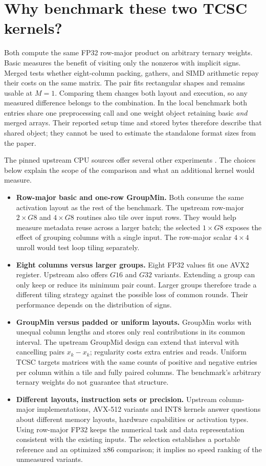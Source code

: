 \documentclass[11pt,a4paper]{article}
\begin{document}
\section{Why benchmark these two TCSC kernels?}
Both compute the same FP32 row-major product on arbitrary ternary weights.
Basic measures the benefit of visiting only the nonzeros with implicit signs.
Merged tests whether eight-column packing, gathers, and SIMD arithmetic repay
their costs on the same matrix. The pair fits rectangular shapes and remains
usable at \(M=1\). Comparing them changes both layout and execution, so any
measured difference belongs to the combination. In the local benchmark both
entries share one preprocessing call and one weight object retaining basic
\emph{and} merged arrays. Their reported setup time and stored bytes therefore
describe that shared object; they cannot be used to estimate the standalone
format sizes from the paper.

The pinned upstream CPU sources offer several other experiments \cite{tcscup}.
The choices below explain the scope of the comparison and what an additional
kernel would measure.
\begin{itemize}
\item \textbf{Row-major basic and one-row GroupMin.} Both consume the same
activation layout as the rest of the benchmark. The upstream row-major
\(2{\times}G8\) and \(4{\times}G8\) routines also tile over input rows.
They would help measure metadata reuse across a larger batch; the selected
\(1{\times}G8\) exposes the effect of grouping columns with a single input.
The row-major scalar \(4{\times}4\) unroll would test loop tiling separately.
\item \textbf{Eight columns versus larger groups.} Eight FP32 values fit
one AVX2 register. Upstream also offers \(G16\) and \(G32\) variants.
Extending a group can only keep or reduce its minimum pair count. Larger
groups therefore trade a different tiling strategy against the possible loss
of common rounds. Their performance depends on the distribution of signs.
\item \textbf{GroupMin versus padded or uniform layouts.} GroupMin works
with unequal column lengths and stores only real contributions in its common
interval. The upstream GroupMid design can extend that interval with cancelling
pairs \(x_k-x_k\); regularity costs extra entries and reads. Uniform TCSC
targets matrices with the same counts of positive and negative entries
per column within a tile and fully paired columns. The benchmark's arbitrary ternary
weights do not guarantee that structure.
\item \textbf{Different layouts, instruction sets or precision.} Upstream
column-major implementations, AVX-512 variants and INT8 kernels answer
questions about different memory layouts, hardware capabilities or activation
types. Using row-major FP32 keeps the numerical task and data representation
consistent with the existing inputs. The selection establishes a portable
reference and an optimized x86 comparison; it implies no speed ranking of the
unmeasured variants.
\end{itemize}
\end{document}
